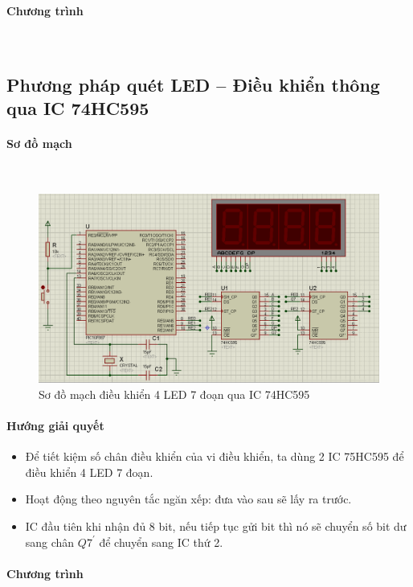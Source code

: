 \paragraph{Chương trình}{~\\}

\tocless \subsection{Phương pháp quét LED -- Điều khiển thông qua IC 74HC595}
\paragraph{Sơ đồ mạch}{~\\}
\begin{figure}[!h]
\begin{center}
\includegraphics[scale=.5]{phu-luc/image/bai-2-phu-luc-4-led-7-seg-74hc595}
\end{center}
\caption{Sơ đồ mạch điều khiển 4 LED 7 đoạn qua IC 74HC595}
\end{figure}
\paragraph{Hướng giải quyết}
\begin{itemize}
\item Để tiết kiệm số chân điều khiển của vi điều khiển, ta dùng 2 IC 75HC595 để điều khiển 4 LED 7 đoạn.
\item Hoạt động theo nguyên tắc ngăn xếp: đưa vào sau sẽ lấy ra trước.
\item IC đầu tiên khi nhận đủ 8 bit, nếu tiếp tục gửi bit thì nó sẽ chuyển số bit dư sang chân $Q7^\prime$ để chuyển sang IC thứ 2.
\end{itemize}
\paragraph{Chương trình}{~\\}

